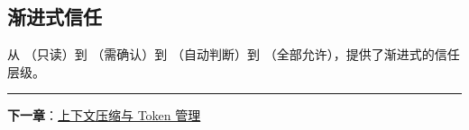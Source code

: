 \subsection{渐进式信任}

从 （只读）到 （需确认）到 （自动判断）到 （全部允许），提供了渐进式的信任层级。

\bigskip\noindent\rule{\textwidth}{0.4pt}\bigskip

\textbf{下一章}：\href{./chapter-09-context-compression.md}{上下文压缩与 Token 管理}
